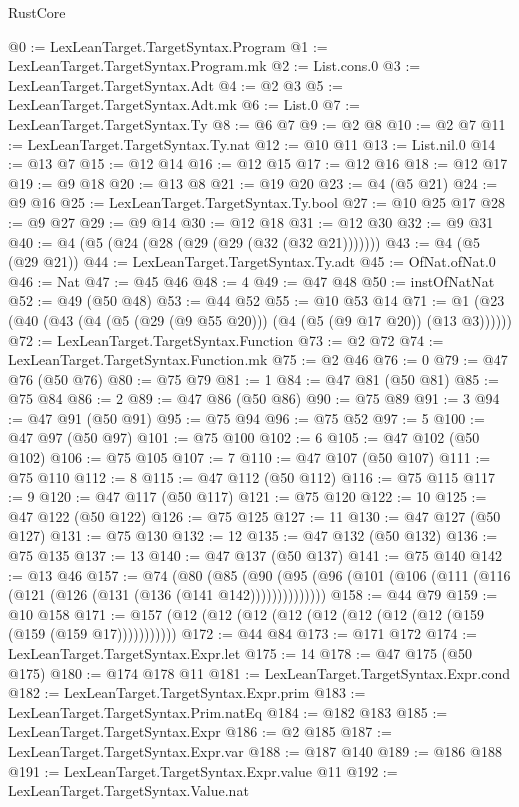 \begin{lexlean}{RustCore}
\begin{coremodule}
@0 := LexLeanTarget.TargetSyntax.Program
@1 := LexLeanTarget.TargetSyntax.Program.mk
@2 := List.cons.{0}
@3 := LexLeanTarget.TargetSyntax.Adt
@4 := @2 @3
@5 := LexLeanTarget.TargetSyntax.Adt.mk
@6 := List.{0}
@7 := LexLeanTarget.TargetSyntax.Ty
@8 := @6 @7
@9 := @2 @8
@10 := @2 @7
@11 := LexLeanTarget.TargetSyntax.Ty.nat
@12 := @10 @11
@13 := List.nil.{0}
@14 := @13 @7
@15 := @12 @14
@16 := @12 @15
@17 := @12 @16
@18 := @12 @17
@19 := @9 @18
@20 := @13 @8
@21 := @19 @20
@23 := @4 (@5 @21)
@24 := @9 @16
@25 := LexLeanTarget.TargetSyntax.Ty.bool
@27 := @10 @25 @17
@28 := @9 @27
@29 := @9 @14
@30 := @12 @18
@31 := @12 @30
@32 := @9 @31
@40 := @4 (@5 (@24 (@28 (@29 (@29 (@32 (@32 @21)))))))
@43 := @4 (@5 (@29 @21))
@44 := LexLeanTarget.TargetSyntax.Ty.adt
@45 := OfNat.ofNat.{0}
@46 := Nat
@47 := @45 @46
@48 := 4
@49 := @47 @48
@50 := instOfNatNat
@52 := @49 (@50 @48)
@53 := @44 @52
@55 := @10 @53 @14
@71 := @1 (@23 (@40 (@43 (@4 (@5 (@29 (@9 @55 @20))) (@4 (@5 (@9 @17 @20)) (@13 @3))))))
@72 := LexLeanTarget.TargetSyntax.Function
@73 := @2 @72
@74 := LexLeanTarget.TargetSyntax.Function.mk
@75 := @2 @46
@76 := 0
@79 := @47 @76 (@50 @76)
@80 := @75 @79
@81 := 1
@84 := @47 @81 (@50 @81)
@85 := @75 @84
@86 := 2
@89 := @47 @86 (@50 @86)
@90 := @75 @89
@91 := 3
@94 := @47 @91 (@50 @91)
@95 := @75 @94
@96 := @75 @52
@97 := 5
@100 := @47 @97 (@50 @97)
@101 := @75 @100
@102 := 6
@105 := @47 @102 (@50 @102)
@106 := @75 @105
@107 := 7
@110 := @47 @107 (@50 @107)
@111 := @75 @110
@112 := 8
@115 := @47 @112 (@50 @112)
@116 := @75 @115
@117 := 9
@120 := @47 @117 (@50 @117)
@121 := @75 @120
@122 := 10
@125 := @47 @122 (@50 @122)
@126 := @75 @125
@127 := 11
@130 := @47 @127 (@50 @127)
@131 := @75 @130
@132 := 12
@135 := @47 @132 (@50 @132)
@136 := @75 @135
@137 := 13
@140 := @47 @137 (@50 @137)
@141 := @75 @140
@142 := @13 @46
@157 := @74
    (@80
      (@85 (@90 (@95 (@96 (@101 (@106 (@111 (@116 (@121 (@126 (@131 (@136 (@141 @142))))))))))))))
@158 := @44 @79
@159 := @10 @158
@171 := @157 (@12 (@12 (@12 (@12 (@12 (@12 (@12 (@12 (@159 (@159 (@159 @17)))))))))))
@172 := @44 @84
@173 := @171 @172
@174 := LexLeanTarget.TargetSyntax.Expr.let
@175 := 14
@178 := @47 @175 (@50 @175)
@180 := @174 @178 @11
@181 := LexLeanTarget.TargetSyntax.Expr.cond
@182 := LexLeanTarget.TargetSyntax.Expr.prim
@183 := LexLeanTarget.TargetSyntax.Prim.natEq
@184 := @182 @183
@185 := LexLeanTarget.TargetSyntax.Expr
@186 := @2 @185
@187 := LexLeanTarget.TargetSyntax.Expr.var
@188 := @187 @140
@189 := @186 @188
@191 := LexLeanTarget.TargetSyntax.Expr.value @11
@192 := LexLeanTarget.TargetSyntax.Value.nat

\end{coremodule}
\end{lexlean}
